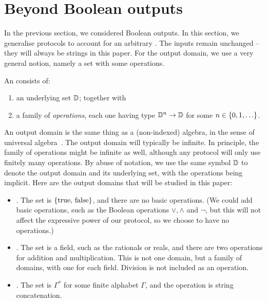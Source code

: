 \section{Beyond Boolean outputs}
\label{sec:beyond-boolean-outputs}

In the previous section, we considered Boolean outputs. In this section, we
generalise protocols to account for an arbitrary . The inputs
remain unchanged -- they will always be strings in this paper.  For the
output domain, we use a very general notion, namely a set with some
operations. 
\begin{definition}
  \AP
    An  consists of: 
    \begin{enumerate}
        \item an underlying set $\mathbb D$; together with
        \item a family of \emph{operations}, each one having  type $\mathbb D^n \to \mathbb D$ for some $n \in \{0,1,\ldots\}$.
    \end{enumerate}
\end{definition}
An output domain is the same thing as a (non-indexed) algebra, in the sense of universal algebra~\cite[p.5]{hobby1988structure}. 
The output domain will typically  be infinite. In principle, the family of operations might be infinite as well,
although any protocol will only use finitely many operations.
By abuse of notation, we use the same symbol $\mathbb D$ to denote the output domain and its underlying set, with the operations being implicit. Here are the output domains that will be studied in this paper: 
\begin{itemize}
    \item {}. The set is $\{\text{true, false}\}$, and there are no basic operations. (We could add basic operations, such as the Boolean operations $\lor,\land$ and $\neg$, but this will not affect the expressive power of our protocol, so we choose to have no operations.)
    \item {}. The set is a field, such as the rationals or reals, and there are two operations for addition and multiplication. This is not one domain, but a family of domains, with one for each field. Division is not included as an operation.
    \item {}. The set is $\Gamma^*$ for some finite alphabet $\Gamma$, and the operation is string concatenation.
\end{itemize}

